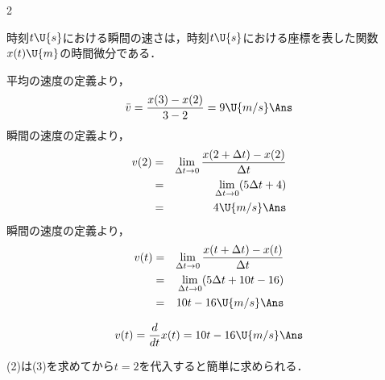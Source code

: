 \begin{multicols}{2}
\begin{sisin}
時刻$t\U{s}$における瞬間の速さは，時刻$t\U{s}$における座標を表した関数$x(t)\U{m}$の時間微分である．
\end{sisin}
\begin{komon}
 平均の速度の定義より，
       \[\bar{v}=\frac{x(3)-x(2)}{3-2}=9\U{m/s}\Ans\]
 瞬間の速度の定義より，
       \begin{eqnarray*}
       v(2)&=&\lim_{\Delta t\to 0}\frac{x(2+\Delta t)-x(2)}{\Delta t}\\
           &=&\lim_{\Delta t\to 0}(5\Delta t+4)\\
           &=&4\U{m/s}\Ans
       \end{eqnarray*}
 瞬間の速度の定義より，
       \begin{eqnarray*}
       v(t)&=&\lim_{\Delta t\to 0}\frac{x(t+\Delta t)-x(t)}{\Delta t}\\
           &=&\lim_{\Delta t\to 0}(5\Delta t+10t-16)\\
           &=&10t-16\U{m/s}\Ans
       \end{eqnarray*}
\end{komon}
\begin{bekkai}
\[v(t)=\frac{d}{dt}x(t)=10t-16\U{m/s}\Ans\]\par
(2)は(3)を求めてから$t=2$を代入すると簡単に求められる．
\end{bekkai}


\end{multicols}
